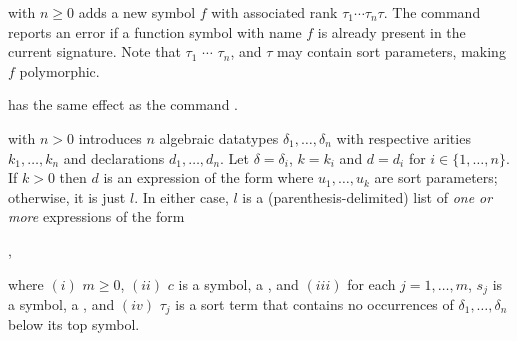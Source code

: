 \begin{description}
\smallskip

%
\item[\expr{(declare-fun $f$ ($\tau_1$ $\cdots$ $\tau_n$) $\tau$)}]
with $n \geq 0$ adds a new symbol $f$ 
with associated rank $\tau_1\cdots\tau_n\tau$.
The command reports an error if a function symbol with name $f$ 
is already present in the current signature.
Note that 
$\tau_1$ $\cdots$ $\tau_n$, and $\tau$ may contain sort parameters,
making $f$ polymorphic.
\smallskip

%
\item[\expr{(declare-const $f$ $\tau$)}]
has the same effect as the command .
\smallskip


%
\item[%
\expr{(declare-datatypes (($\delta_1$ $k_1$) $\cdots$ ($\delta_n$ $k_n$))
                         ($d_1$ $\cdots$ $d_n$))}]
with $n > 0$ introduces $n$ algebraic datatypes $\delta_1,\dots,\delta_n$
with respective arities $k_1,\dots,k_n$ and declarations $d_1,\dots,d_n$. 
Let $\delta = \delta_i$, $k = k_i$ and $d = d_i$ for $i \in \{1,\ldots,n\}$.
If $k >0$ then $d$ is an expression of the form 
where $u_1, \ldots, u_k$ are sort parameters;
otherwise, it is just $l$. 
In either case, $l$ is a (parenthesis-delimited) list of \emph{one or more} 
expressions of the form
%
\begin{center}
 ,
\end{center}
where 
$(i)$ $m \geq 0$, 
$(ii)$ $c$ is a symbol, a , and 
$(iii)$ for each $j=1,\ldots,m$, $s_j$ is a symbol, a , and 
$(iv)$ $\tau_j$ is a sort term
that contains no occurrences of $\delta_1, \ldots, \delta_n$ below its top symbol.


\end{description}
